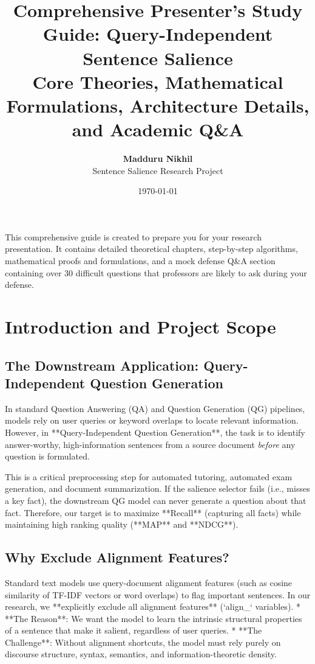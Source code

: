 \documentclass[11pt,a4paper]{article}
\title{
    \vspace{-2cm}
    \textbf{Comprehensive Presenter's Study Guide: Query-Independent Sentence Salience}\\
    \large Core Theories, Mathematical Formulations, Architecture Details, and Academic Q\&A
}
\author{\textbf{Madduru Nikhil} \\ Sentence Salience Research Project}
\date{\today}
\begin{document}
\maketitle

\begin{tcolorbox}[colback=bglight,colframe=accent,title=Purpose of this Document]
This comprehensive guide is created to prepare you for your research presentation. It contains detailed theoretical chapters, step-by-step algorithms, mathematical proofs and formulations, and a mock defense Q\&A section containing over 30 difficult questions that professors are likely to ask during your defense.
\end{tcolorbox}

\tableofcontents
\newpage

\section{Introduction and Project Scope}

\subsection{The Downstream Application: Query-Independent Question Generation}
In standard Question Answering (QA) and Question Generation (QG) pipelines, models rely on user queries or keyword overlaps to locate relevant information. However, in **Query-Independent Question Generation**, the task is to identify answer-worthy, high-information sentences from a source document \textit{before} any question is formulated.

This is a critical preprocessing step for automated tutoring, automated exam generation, and document summarization. If the salience selector fails (i.e., misses a key fact), the downstream QG model can never generate a question about that fact. Therefore, our target is to maximize **Recall** (capturing all facts) while maintaining high ranking quality (**MAP** and **NDCG**).

\subsection{Why Exclude Alignment Features?}
Standard text models use query-document alignment features (such as cosine similarity of TF-IDF vectors or word overlaps) to flag important sentences. 
In our research, we **explicitly exclude all alignment features** (`align\_` variables). 
* **The Reason**: We want the model to learn the intrinsic structural properties of a sentence that make it salient, regardless of user queries.
* **The Challenge**: Without alignment shortcuts, the model must rely purely on discourse structure, syntax, semantics, and information-theoretic density.
\end{document}
